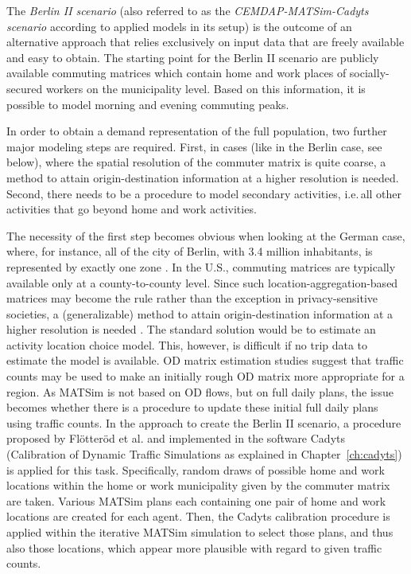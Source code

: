 The \textit{Berlin II scenario} (also referred to as the \textit{CEMDAP-MATSim-Cadyts scenario} according to applied models in its setup) is the outcome of an alternative approach that relies exclusively on input data that are freely available and easy to obtain. The starting point for the Berlin II scenario are publicly available commuting matrices which contain home and work places of socially-secured workers on the municipality level. Based on this information, it is possible to model morning and evening commuting peaks.

In order to obtain a demand representation of the full population, two further major modeling steps are required. First, in cases (like in the Berlin case, see below), where the spatial resolution of the commuter matrix is quite coarse, a method to attain origin-destination information at a higher resolution is needed. Second, there needs to be a procedure to model secondary activities, i.e.\,all other activities that go beyond home and work activities.

The necessity of the first step becomes obvious when looking at the German case, where, for instance, all of the city of Berlin, with 3.4 million inhabitants, is represented by exactly one zone \citep{BA2010Pendlerstatistik}. In the U.S., commuting matrices are typically available only at a county-to-county level. Since such location-aggregation-based matrices may become the rule rather than the exception in privacy-sensitive societies, a (generalizable) method to attain origin-destination information at a higher resolution is needed \citep{ ZiemkeNagelBhat2015IntegratingCemdapMatsimTransferabilityTRB}. The standard solution would be to estimate an activity location choice model. This, however, is difficult if no trip data to estimate the model is available. OD matrix estimation studies \citep{ZuylenWillumsenMatrix-from-cnts} suggest that traffic counts may be used to make an initially rough OD matrix more appropriate for a region. As MATSim is not based on OD flows, but on full daily plans, the issue becomes whether there is a procedure to update these initial full daily plans using traffic counts. In the approach to create the Berlin II scenario, a procedure proposed by Flötteröd et al. \citep{FloetteroedBierlaireNagel2010Bayesian} and implemented in the software Cadyts (Calibration of Dynamic Traffic Simulations \citep{Floetteroed2010Manual110} as explained in Chapter~\ref{ch:cadyts}) is applied for this task. Specifically, random draws of possible home and work locations within the home or work municipality given by the commuter matrix are taken. Various MATSim plans each containing one pair of home and work locations are created for each agent. Then, the Cadyts calibration procedure is applied within the iterative MATSim simulation to select those plans, and thus also those locations, which appear more plausible with regard to given traffic counts.

